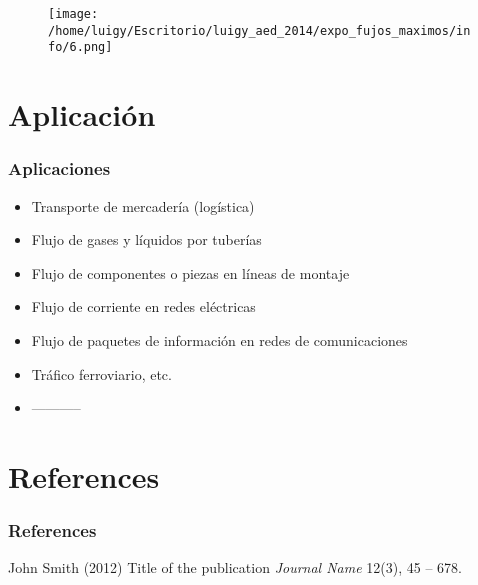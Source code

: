 \documentclass{beamer}
\begin{document}
    \begin{frame}
	  \begin{figure}
	    \texttt{[image: /home/luigy/Escritorio/luigy\_aed\_2014/expo\_fujos\_maximos/info/6.png]}
	  \end{figure}
	\end{frame}


	
\section{Aplicaci\'on}

  \begin{frame}
      \frametitle{Aplicaciones}
      \begin{itemize}
	\item Transporte de mercadería (logística)
	\item Flujo de gases y líquidos por tuberías
	\item Flujo de componentes o piezas en líneas de montaje
	\item Flujo de corriente en redes eléctricas
	\item Flujo de paquetes de información en redes de comunicaciones
	\item Tráfico ferroviario, etc.
      \item -----------
      
      \end{itemize}
      \end{frame}


      	
\section{References}

	\begin{frame}
	\frametitle{References}
	  \footnotesize{
	    \begin{thebibliography}{99} %
	     John Smith (2012)
	    \newblock Title of the publication
	    \newblock \emph{Journal Name} 12(3), 45 -- 678.
	    \end{thebibliography}
	  }
	\end{frame}

	
	
\end{document}
